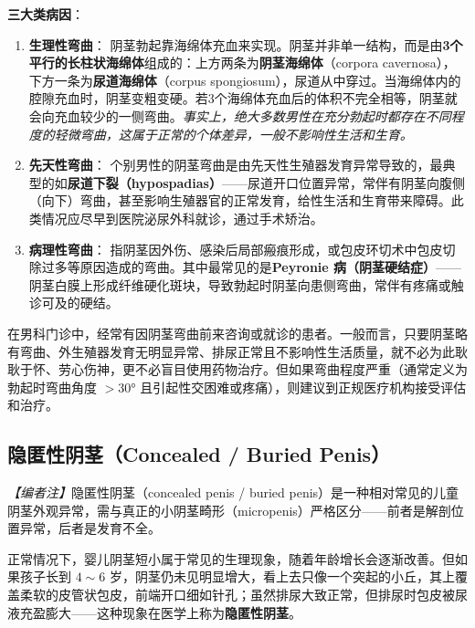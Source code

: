 \vspace{0.5em}
\noindent\textbf{三大类病因}：

\begin{enumerate}
	\item \textbf{生理性弯曲}：
	阴茎勃起靠海绵体充血来实现。阴茎并非单一结构，而是由\textbf{3个平行的长柱状海绵体}组成的：上方两条为\textbf{阴茎海绵体}（corpora cavernosa），下方一条为\textbf{尿道海绵体}（corpus spongiosum），尿道从中穿过。当海绵体内的腔隙充血时，阴茎变粗变硬。若3个海绵体充血后的体积不完全相等，阴茎就会向充血较少的一侧弯曲。\textit{事实上，绝大多数男性在充分勃起时都存在不同程度的轻微弯曲，这属于正常的个体差异，一般不影响性生活和生育。}

	\item \textbf{先天性弯曲}：
	个别男性的阴茎弯曲是由先天性生殖器发育异常导致的，最典型的如\textbf{尿道下裂（hypospadias）}——尿道开口位置异常，常伴有阴茎向腹侧（向下）弯曲，甚至影响生殖器官的正常发育，给性生活和生育带来障碍。此类情况应尽早到医院泌尿外科就诊，通过手术矫治。

	\item \textbf{病理性弯曲}：
	指阴茎因外伤、感染后局部瘢痕形成，或包皮环切术中包皮切除过多等原因造成的弯曲。其中最常见的是\textbf{Peyronie 病（阴茎硬结症）}——阴茎白膜上形成纤维硬化斑块，导致勃起时阴茎向患侧弯曲，常伴有疼痛或触诊可及的硬结。
\end{enumerate}

\begin{tcolorbox}[colback=pink!5!white,colframe=red!50!black,title=贴心小叮咛]
在男科门诊中，经常有因阴茎弯曲前来咨询或就诊的患者。一般而言，只要阴茎略有弯曲、外生殖器发育无明显异常、排尿正常且不影响性生活质量，就不必为此耿耿于怀、劳心伤神，更不必盲目使用药物治疗。但如果弯曲程度严重（通常定义为勃起时弯曲角度 $> 30°$ 且引起性交困难或疼痛），则建议到正规医疗机构接受评估和治疗。
\end{tcolorbox}

\subsection{隐匿性阴茎（Concealed / Buried Penis）}

\noindent\textit{【编者注】}隐匿性阴茎（concealed penis / buried penis）是一种相对常见的儿童阴茎外观异常，需与真正的小阴茎畸形（micropenis）严格区分——前者是解剖位置异常，后者是发育不全。

\vspace{0.5em}
正常情况下，婴儿阴茎短小属于常见的生理现象，随着年龄增长会逐渐改善。但如果孩子长到 $4\sim6$ 岁，阴茎仍未见明显增大，看上去只像一个突起的小丘，其上覆盖柔软的皮管状包皮，前端开口细如针孔；虽然排尿大致正常，但排尿时包皮被尿液充盈膨大——这种现象在医学上称为\textbf{隐匿性阴茎}。

